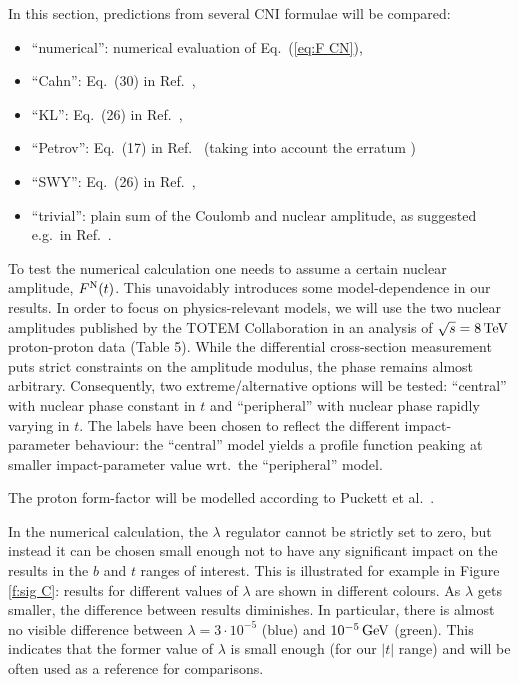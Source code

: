 \documentclass[pdftex,twocolumn,epjc3]{svjour3}
\def\un#1{\,{\rm #1}}
\begin{document}
In this section, predictions from several CNI formulae will be compared:
\begin{itemize}
\item ``numerical'': numerical evaluation of Eq.~(\ref{eq:F CN}),
\item ``Cahn'': Eq.~(30) in Ref.~\cite{cahn82},
\item ``KL'': Eq.~(26) in Ref.~\cite{kl94},
\item ``Petrov'': Eq.~(17) in Ref.~\cite{petrov2018} (taking into account the erratum \cite{petrov2018-erratum})
\item ``SWY'': Eq.~(26) in Ref.~\cite{wy68},
\item ``trivial'': plain sum of the Coulomb and nuclear amplitude, as suggested e.g.~in Ref.~\cite{godizov2019}.
\end{itemize}

To test the numerical calculation one needs to assume a certain nuclear amplitude, $F^{\rm N}(t)$. This unavoidably introduces some model-dependence in our results. In order to focus on physics-relevant models, we will use the two nuclear amplitudes published by the TOTEM Collaboration in an analysis of $\sqrt s = 8\un{TeV}$ proton-proton data \cite{totem-8tev-1km} (Table 5). While the differential cross-section measurement puts strict constraints on the amplitude modulus, the phase remains almost arbitrary. Consequently, two extreme/alternative options will be tested: ``central'' with nuclear phase constant in $t$ and ``peripheral'' with nuclear phase rapidly varying in $t$. The labels have been chosen to reflect the different impact-parameter behaviour: the ``central'' model yields a profile function peaking at smaller impact-parameter value wrt.~the ``peripheral'' model.

The proton form-factor will be modelled according to Puckett et al.~\cite{puckett}.

In the numerical calculation, the $\lambda$ regulator cannot be strictly set to zero, but instead it can be chosen small enough not to have any significant impact on the results in the $b$ and $t$ ranges of interest. This is illustrated for example in Figure \ref{f:sig C}: results for different values of $\lambda$ are shown in different colours. As $\lambda$ gets smaller, the difference between results diminishes. In particular, there is almost no visible difference between $\lambda = 3\cdot 10^{-5}$ (blue) and $10^{-5}\un{GeV}$ (green). This indicates that the former value of $\lambda$ is small enough (for our $|t|$ range) and will be often used as a reference for comparisons.
\end{document}
